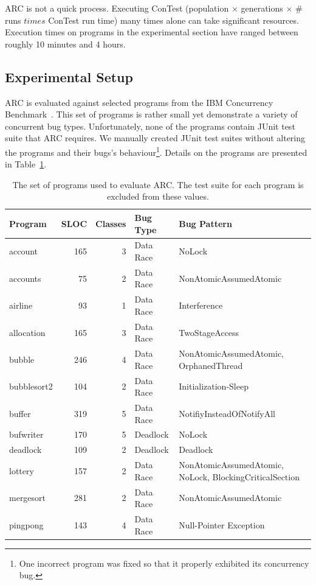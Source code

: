 \documentclass{llncs}
\begin{document}
ARC is not a quick process. Executing ConTest (population $\times$ generations
$\times$ \# runs $times$ ConTest run time) many times alone can take significant
resources. Execution times on programs in the experimental section have ranged between
roughly 10 minutes and 4 hours.

\subsection{Experimental Setup}
\label{sec:experimental_setup}

ARC is evaluated against selected programs from the IBM Concurrency
Benchmark~\cite{EHSU06}. This set of programs is rather small yet demonstrate a
variety of concurrent bug types. Unfortunately, none of the programs contain
JUnit test suite that ARC requires. We manually created JUnit test suites
without altering the programs and their bugs's behaviour\footnote{One incorrect
program was fixed so that it properly exhibited its concurrency bug.}. Details
on the programs are presented in Table~\ref{tbl:used_programs}.


\begin{table}[h]
\caption{The set of programs used to evaluate ARC. The test suite for each
program is excluded from these values.}
\begin{center}
\begin{tabular}{|l|r|r|l|l|}
\hline
\textbf{Program} & \textbf{SLOC} & \textbf{Classes} & \textbf{Bug Type} & \textbf{Bug Pattern}\\
\hline
account & 165 & 3 & Data Race & NoLock\\
\hline
accounts & 75 & 2 & Data Race & NonAtomicAssumedAtomic\\
\hline
airline & 93 & 1 & Data Race & Interference\\
\hline
allocation & 165 & 3 & Data Race & TwoStageAccess\\
\hline
bubble & 246 & 4 & Data Race & NonAtomicAssumedAtomic, OrphanedThread\\
\hline
bubblesort2 & 104 & 2 & Data Race & Initialization-Sleep\\
\hline
buffer & 319 & 5 & Data Race & NotifiyInsteadOfNotifyAll\\
\hline
bufwriter & 170 & 5 & Deadlock & NoLock\\
\hline
deadlock & 109 & 2 & Deadlock & Deadlock\\
\hline
lottery & 157 & 2 & Data Race & NonAtomicAssumedAtomic, NoLock, BlockingCriticalSection\\
\hline
mergesort & 281 & 2 & Data Race & NonAtomicAssumedAtomic\\
\hline
pingpong & 143 & 4 & Data Race & Null-Pointer Exception\\
\hline
\end{tabular}
\label{tbl:used_programs}
\end{center}
\end{table}
\end{document}
